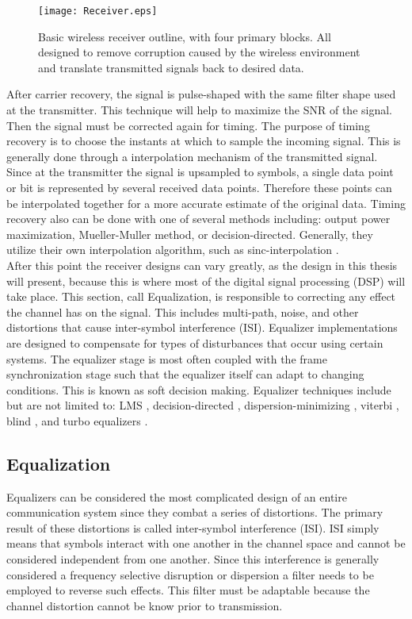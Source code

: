 \begin{figure}[!ht]\label{Receiver_Blocks}
\centering
\texttt{[image: Receiver.eps]}
\caption{Basic wireless receiver outline, with four primary blocks.  All designed to remove corruption caused by the wireless environment and translate transmitted signals back to desired data.}
\end{figure}

After carrier recovery, the signal is pulse-shaped with the same filter shape used at the transmitter.  This technique will help to maximize the SNR of the signal.  Then the signal must be corrected again for timing.  The purpose of timing recovery is to choose the instants at which to sample the incoming signal.  This is generally done through a interpolation mechanism of the transmitted signal.  Since at the transmitter the signal is upsampled to symbols, a single data point or bit is represented by several received data points.  Therefore these points can be interpolated together for a more accurate estimate of the original data.  Timing recovery also can be done with one of several methods including: output power maximization, Mueller-Muller method, or decision-directed.  Generally, they utilize their own interpolation algorithm, such as sinc-interpolation \cite{TBD}.\\

After this point the receiver designs can vary greatly, as the design in this thesis will present, because this is where most of the digital signal processing (DSP) will take place.  This section, call Equalization, is responsible to correcting any effect the channel has on the signal. This includes multi-path, noise, 	and other distortions that cause inter-symbol interference (ISI).  Equalizer implementations are designed to compensate for types of disturbances that occur using certain systems.  The equalizer stage is most often coupled with the frame synchronization stage such that the equalizer itself can adapt to changing conditions.  This is known as soft decision making.  Equalizer techniques include but are not limited to: LMS \cite{TBD}, decision-directed \cite{TBD}, dispersion-minimizing \cite{TBD}, viterbi \cite{TBD}, blind \cite{TBD}, and turbo equalizers \cite{TBD}.\\  

\subsection{Equalization}

Equalizers can be considered the most complicated design of an entire communication system since they combat a series of distortions.  The primary result of these distortions is called inter-symbol interference (ISI).  ISI simply means that symbols interact with one another in the channel space and cannot be considered independent from one another.  Since this interference is generally considered a frequency selective disruption or dispersion a filter needs to be employed to reverse such effects.  This filter must be adaptable because the channel distortion cannot be know prior to transmission.\\  

